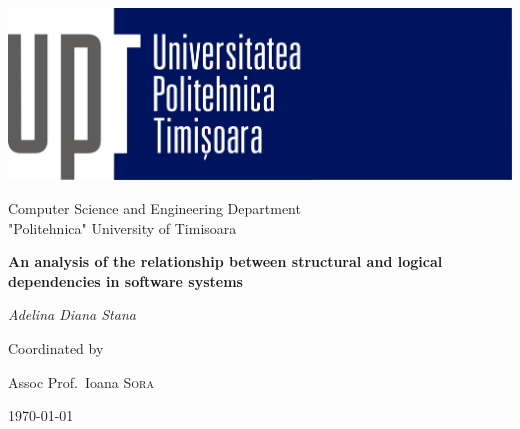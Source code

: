 \begin{titlepage}


\thispagestyle{empty}
\setlength\headheight{0pt} 
\begin{center}


\hfill \includegraphics[width=0.45\linewidth]{oxlogo.jpg}            


        \vspace{3cm}
        {\LARGE Computer Science and Engineering Department\\
"Politehnica" University of Timisoara \par}
        \vspace{3cm}

        {\Large\bfseries An analysis of the relationship between structural and logical\\ dependencies in software systems \par}
        
        \vspace{3cm}
        {\Large\itshape Adelina Diana Stana\par}
        \vspace{0.25cm}

\vspace{1cm}
Coordinated by\par
Assoc Prof.~Ioana \textsc{Sora}\par
\vspace{1.5cm}
\large
\today

\end{center}

\clearpage
\restoregeometry
\end{titlepage}
